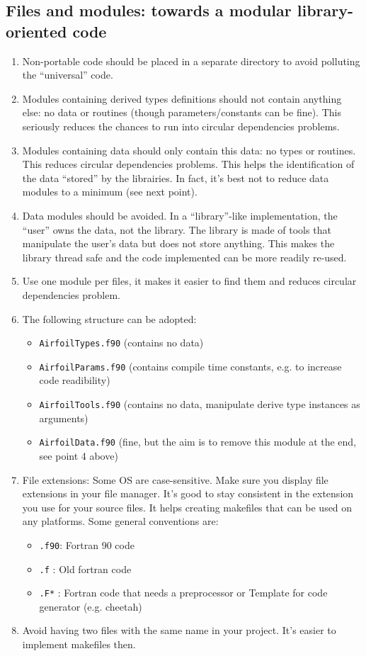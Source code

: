\documentclass{article}
\begin{document}
\subsection{Files and modules: towards a modular library-oriented code}
\begin{enumerate}
    \item Non-portable code should be placed in a separate directory to avoid polluting the ``universal'' code.
    \item Modules containing derived types definitions should not contain anything else: no data or routines (though parameters/constants can be fine).  This seriously reduces the chances to run into circular dependencies problems. 
    \item Modules containing data should only contain this data: no types or routines. This reduces circular dependencies problems. This helps the identification of the data ``stored'' by the librairies. In fact, it's best not to reduce data modules to a minimum (see next point).
    \item Data modules should be avoided. In a ``library''-like implementation, the ``user'' owns the data, not the library. The library is made of tools that manipulate the user's data but does not store anything. This makes the library thread safe and the code implemented can be more readily re-used.
    \item Use one module per files, it makes it easier to find them and reduces circular dependencies problem.
    \item The following structure can be adopted:
        \begin{itemize}
            \item \verb|AirfoilTypes.f90|  (contains no data)
            \item \verb|AirfoilParams.f90| (contains compile time constants, e.g. to increase code readibility)
            \item \verb|AirfoilTools.f90|  (contains no data, manipulate derive type instances as arguments)
            \item \verb|AirfoilData.f90| (fine, but the aim is to remove this module at the end, see point 4 above)
        \end{itemize}
    \item File extensions: Some OS are case-sensitive. Make sure you display file extensions in your file manager. It's good to stay consistent in the extension you use for your source files. It helps creating makefiles that can be used on any platforms. Some general conventions are:
        \begin{itemize}
            \item \verb|.f90|: Fortran 90 code
            \item \verb|.f|  : Old fortran code
            \item \verb|.F*|  : Fortran code that needs a preprocessor or Template for code generator (e.g. cheetah)
        \end{itemize}
    \item Avoid having two files with the same name in your project. It's easier to implement makefiles then.
\end{enumerate}
\end{document}
